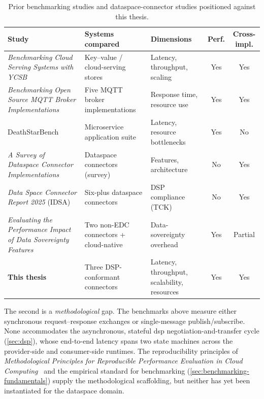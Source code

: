 \begin{table}[ht]
    \centering
    \small
    \setlength{\tabcolsep}{4pt}
    \begin{tabularx}{\textwidth}{@{}>{\raggedright\arraybackslash}p{3.5cm} X X c c@{}}
        \toprule
        \textbf{Study} & \textbf{Systems compared} & \textbf{Dimensions} & \textbf{Perf.} & \textbf{Cross-impl.} \\
        \midrule
        \emph{Benchmarking Cloud Serving Systems with YCSB}~\citep{cooper2010ycsb} & Key--value / cloud-serving stores & Latency, throughput, scaling & Yes & Yes \\
        \addlinespace
        \emph{Benchmarking Open Source MQTT Broker Implementations}~\citep{dizdarevic2023mqttbrokers} & Five MQTT broker implementations & Response time, resource use & Yes & Yes \\
        \addlinespace
        DeathStarBench~\citep{gan2019deathstarbench} & Microservice application suite & Latency, resource bottlenecks & Yes & No \\
        \addlinespace
        \emph{A Survey of Dataspace Connector Implementations}~\citep{dam2024surveydataspaceconnectorimplementations} & Dataspace connectors (survey) & Features, architecture & No & Yes \\
        \addlinespace
        \emph{Data Space Connector Report 2025} (IDSA)~\citep{idsaConnectorReport2025} & Six-plus dataspace connectors & DSP compliance (TCK) & No & Yes \\
        \addlinespace
        \emph{Evaluating the Performance Impact of Data Sovereignty Features}~\citep{evaluatingtheperformanceimpactofdatasovereignty} & Two non-EDC connectors + cloud-native & Data-sovereignty overhead & Yes & Partial \\
        \midrule
        \textbf{This thesis} & Three DSP-conformant connectors & Latency, throughput, scalability, resources & Yes & Yes \\
        \bottomrule
    \end{tabularx}
    \captionsetup{format=plain,justification=centering}
    \caption[Prior benchmarking and connector studies versus this thesis]{Prior benchmarking studies and dataspace-connector studies positioned against this thesis.}
    \label{tab:related-work-comparison}
\end{table}

The second is a \emph{methodological} gap. The benchmarks above measure either synchronous request--response exchanges or single-message publish/subscribe. None accommodates the asynchronous, stateful \gls{dsp} negotiation-and-transfer cycle (\cref{sec:dsp}), whose end-to-end latency spans two state machines across the provider-side and consumer-side runtimes. The reproducibility principles of \emph{Methodological Principles for Reproducible Performance Evaluation in Cloud Computing}~\citep{papadopoulos2021reproducible} and the empirical standard for benchmarking (\cref{sec:benchmarking-fundamentals}) supply the methodological scaffolding, but neither has yet been instantiated for the dataspace domain.

